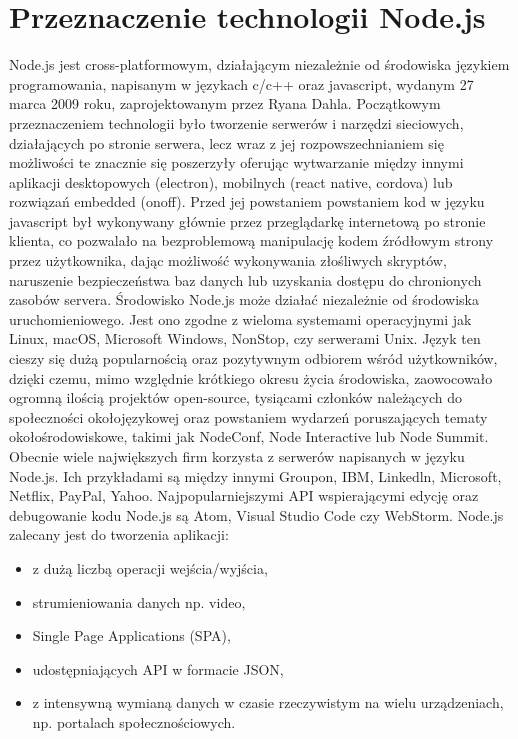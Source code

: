 \documentclass[12pt]{report}
\begin{document}
  \section{Przeznaczenie technologii Node.js}
    Node.js jest cross-platformowym, działającym niezależnie od środowiska językiem programowania, napisanym w językach c/c++ oraz javascript, wydanym 27 marca 2009 roku, zaprojektowanym przez Ryana Dahla.
    Początkowym przeznaczeniem technologii było tworzenie serwerów i narzędzi sieciowych, działających po stronie serwera, lecz wraz z jej rozpowszechnianiem się możliwości te znacznie się poszerzyły oferując wytwarzanie między innymi aplikacji desktopowych (electron), mobilnych (react native, cordova) lub rozwiązań embedded (onoff).
    Przed jej powstaniem powstaniem kod w języku javascript był wykonywany głównie przez przeglądarkę internetową po stronie klienta, co pozwalało na bezproblemową manipulację kodem źródłowym strony przez użytkownika, dając możliwość wykonywania złośliwych skryptów, naruszenie bezpieczeństwa baz danych lub uzyskania dostępu do chronionych zasobów servera.
    Środowisko Node.js może działać niezależnie od środowiska uruchomieniowego.
    Jest ono zgodne z wieloma systemami operacyjnymi jak  Linux, macOS, Microsoft Windows, NonStop, czy serwerami Unix.
    Język ten cieszy się dużą popularnością oraz pozytywnym odbiorem wśród użytkowników, dzięki czemu, mimo względnie krótkiego okresu życia środowiska, zaowocowało ogromną ilością projektów open-source, tysiącami członków należących do społeczności okołojęzykowej oraz powstaniem wydarzeń poruszających tematy okołośrodowiskowe, takimi jak NodeConf, Node Interactive lub Node Summit.
    Obecnie wiele największych firm korzysta z serwerów napisanych w języku Node.js.
    Ich przykładami są między innymi Groupon, IBM, Linkedln, Microsoft, Netflix, PayPal, Yahoo.
    Najpopularniejszymi API wspierającymi edycję oraz debugowanie kodu Node.js są Atom, Visual Studio Code czy WebStorm.
    \newline Node.js zalecany jest do tworzenia aplikacji: 
    \begin{itemize}
      \item z dużą liczbą operacji wejścia/wyjścia,
      \item strumieniowania danych np. video, 
      \item Single Page Applications (SPA),
      \item udostępniających API w formacie JSON,
      \item z intensywną wymianą danych w czasie rzeczywistym na wielu urządzeniach, np. portalach społecznościowych.
    \end{itemize} 
\end{document}

